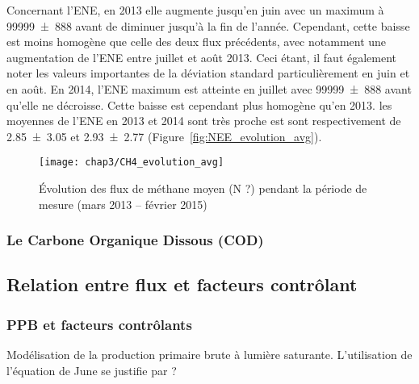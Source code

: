 
Concernant l'ENE, en 2013 elle augmente jusqu'en juin avec un maximum à \SI{99999(888)}{\uml} avant de diminuer jusqu'à la fin de l'année.
Cependant, cette baisse est moins homogène que celle des deux flux précédents, avec notamment une augmentation de l'ENE entre juillet et août 2013.
Ceci étant, il faut également noter les valeurs importantes de la déviation standard particulièrement en juin et en août.
En 2014, l'ENE maximum est atteinte en juillet avec \SI{99999(888)}{\uml} avant qu'elle ne décroisse.
Cette baisse est cependant plus homogène qu'en 2013.
les moyennes de l'ENE en 2013 et 2014 sont très proche est sont respectivement de \SI{2.85(305)}{\uml} et \SI{2.93(277)}{\uml} (Figure~\ref{fig:NEE_evolution_avg}).




\begin{figure}
\centering
\texttt{[image: chap3/CH4\_evolution\_avg]}
\caption{Évolution des flux de méthane moyen (N ?) pendant la période de mesure (mars 2013 -- février 2015)}
\label{fig:CH4_evolution_avg}
\end{figure}

\subsubsection{Le Carbone Organique Dissous (COD)}


\subsection{Relation entre flux et facteurs contrôlant}

\subsubsection{PPB et facteurs contrôlants}

Modélisation de la production primaire brute à lumière saturante.
L'utilisation de l'équation de June se justifie par ?

